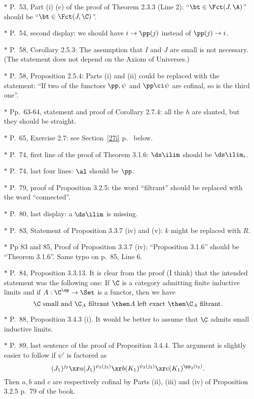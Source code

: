 \documentclass[12pt]{article}
\theoremstyle{remark}
\theoremstyle{definition}
\begin{document}
\nn$*$ P.~53, Part (i) (c) of the proof of Theorem 2.3.3 (Line 2): ``$\bt\in\Fct(J,\A)$'' should be ``$\bt\in\Fct(J,\C)$''.

\nn$*$ P.~54, second display: we should have $i\to\pp(j)$ instead of $\pp(j)\to i$.

\nn$*$ P.~58, Corollary 2.5.3: The assumption that $I$ and $J$ are small is not necessary. (The statement does not depend on the Axiom of Universes.) 

\nn$*$ P.~58, Proposition 2.5.4: Parts (i) and (ii) could be replaced with the statement: ``If two of the functors $\pp,\psi$ and $\pp\ci\psi$ are cofinal, so is the third one''.

\nn$*$ Pp.~63-64, statement and proof of Corollary 2.7.4: all the $h$ are slanted, but they should be straight.

\nn$*$ P.~65, Exercise 2.7: see Section~\ref{27i} p.~ below.

\nn$*$ P.~74, first line of the proof of Theorem 3.1.6: $\ds\ilim$ should be $\ds\ilim_i$. 

\nn$*$ P.~74, last four lines: $\al$ should be $\pp$.

\nn$*$ P.~79, proof of Proposition 3.2.5: the word ``filtrant'' should be replaced with the word ``connected''.

\nn$*$ P.~80, last display: a $\ds\ilim$ is missing.

\nn$*$ P.~83, Statement of Proposition 3.3.7 (iv) and (v): $k$ might be replaced with $R$. 

\nn$*$ Pp 83 and 85, Proof of Proposition 3.3.7 (iv): ``Proposition 3.1.6'' should be ``Theorem 3.1.6''. Same typo on p.~85, Line 6.

\nn$*$ P.~84, Proposition 3.3.13. It is clear from the proof (I think) that the intended statement was the following one: If $\C$ is a category admitting finite inductive limits and if $A:\C^{\op}\to\Set$ is a functor, then we have 
$$
\C\text{ small and }\C_A\text{ filtrant }\then A\text{ left exact }\then\C_A\text{ filtrant}.
$$

\nn$*$ P.~88, Proposition 3.4.3 (i). It would be better to assume that $\C$ admits small inductive limits.

\nn$*$ P.~89, last sentence of the proof of Proposition 3.4.4. The argument is slightly easier to follow if $\psi'$ is factored as 
$$
(J_1)^{j_2}\xr a(J_1)^{\psi_2(j_2)}\xr b(K_1)^{\psi_2(j_2)}\xr c(K_1)^{\pp_2(i_2)}.
$$ 
Then $a,b$ and $c$ are respectively cofinal by Parts (ii), (iii) and (iv) of Proposition 3.2.5 p.~79 of the book.
\end{document}
